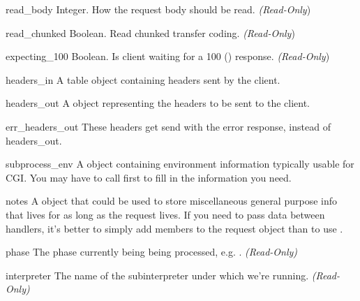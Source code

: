 \begin{memberdesc}[request]{read_body}
  Integer. How the request body should be read.
  \emph{(Read-Only})
\end{memberdesc}

\begin{memberdesc}[request]{read_chunked}
  Boolean. Read chunked transfer coding.
  \emph{(Read-Only})
\end{memberdesc}

\begin{memberdesc}[request]{expecting_100}
  Boolean. Is client waiting for a 100 () response.
  \emph{(Read-Only})
\end{memberdesc}

\begin{memberdesc}[request]{headers_in}
  A table object containing headers sent by the client.
\end{memberdesc}

\begin{memberdesc}[request]{headers_out}
  A  object representing the headers to be sent to the
  client. 
\end{memberdesc}

\begin{memberdesc}[request]{err_headers_out}
  These headers get send with the error response, instead of
  headers_out.
\end{memberdesc}

\begin{memberdesc}[request]{subprocess_env}
  A  object containing environment information typically usable for CGI.
  You may have to call  first to fill in the information
  you need.
\end{memberdesc}

\begin{memberdesc}[request]{notes}
  A  object that could be used to store miscellaneous
  general purpose info that lives for as long as the request lives. If
  you need to pass data between handlers, it's better to simply add
  members to the request object than to use .
\end{memberdesc}

\begin{memberdesc}[request]{phase}
  The phase currently being being processed, e.g. .
  \emph{(Read-Only)}
\end{memberdesc}

\begin{memberdesc}[request]{interpreter}
  The name of the subinterpreter under which we're running.
  \emph{(Read-Only)}
\end{memberdesc}

